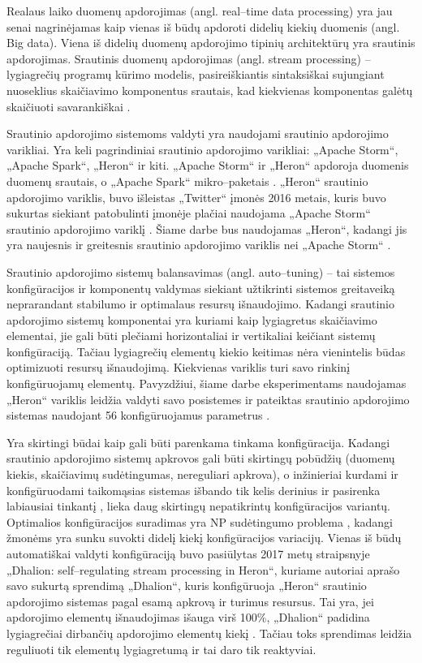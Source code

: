 \documentclass{VUMIFPSbakalaurinis}
\begin{document}
Realaus laiko duomenų apdorojimas (angl. real–time data processing) yra jau senai nagrinėjamas kaip vienas iš būdų apdoroti didelių kiekių duomenis (angl. Big data). Viena iš didelių duomenų apdorojimo tipinių architektūrų yra srautinis apdorojimas. Srautinis duomenų apdorojimas (angl. stream processing) – lygiagrečių programų kūrimo modelis, pasireiškiantis sintaksiškai sujungiant nuoseklius skaičiavimo komponentus srautais, kad kiekvienas komponentas galėtų skaičiuoti savarankiškai \cite{shortstreamproc}. 

Srautinio apdorojimo sistemoms valdyti yra naudojami srautinio apdorojimo varikliai. Yra keli pagrindiniai srautinio apdorojimo varikliai: „Apache Storm“, „Apache Spark“, „Heron“ ir kiti. „Apache Storm“ ir „Heron“ apdoroja duomenis duomenų srautais, o „Apache Spark“ mikro–paketais \cite{karau2015learning}. „Heron“ srautinio apdorojimo variklis, buvo išleistas „Twitter“ įmonės 2016 metais, kuris buvo sukurtas siekiant patobulinti įmonėje plačiai naudojama „Apache Storm“ srautinio apdorojimo variklį \cite{openSourcing}. Šiame darbe bus naudojamas „Heron“, kadangi jis yra naujesnis ir greitesnis srautinio apdorojimo variklis nei „Apache Storm“ \cite{twitterHeron}. 

Srautinio apdorojimo sistemų balansavimas (angl. auto–tuning) – tai sistemos konfigūracijos ir komponentų valdymas siekiant užtikrinti sistemos greitaveiką neprarandant stabilumo ir optimalaus resursų išnaudojimo. Kadangi srautinio apdorojimo sistemų komponentai yra kuriami kaip lygiagretus skaičiavimo elementai, jie gali būti plečiami horizontaliai ir vertikaliai \cite{shortstreamproc} keičiant sistemų konfigūraciją. Tačiau lygiagrečių elementų kiekio keitimas nėra vienintelis būdas optimizuoti resursų išnaudojimą. Kiekvienas variklis turi savo rinkinį konfigūruojamų elementų. Pavyzdžiui, šiame darbe eksperimentams naudojamas „Heron“ variklis leidžia valdyti savo posistemes ir pateiktas srautinio apdorojimo sistemas naudojant 56 konfigūruojamus parametrus \cite{configDocument}.

Yra skirtingi būdai kaip gali būti parenkama tinkama konfigūracija. Kadangi srautinio apdorojimo sistemų apkrovos gali būti skirtingų pobūdžių (duomenų kiekis, skaičiavimų sudėtingumas, nereguliari apkrova), o inžinieriai kurdami ir konfigūruodami taikomąsias sistemas išbando tik kelis derinius ir pasirenka labiausiai tinkantį \cite{selfRegulatingStreaming}, lieka daug skirtingų nepatikrintų konfigūracijos variantų. Optimalios konfigūracijos suradimas yra NP sudėtingumo problema \cite{automateTuning}, kadangi žmonėms yra sunku suvokti didelį kiekį konfigūracijos variacijų. 
Vienas iš būdų automatiškai valdyti konfigūraciją buvo pasiūlytas 2017 metų straipsnyje „Dhalion: self–regulating stream processing in Heron“, kuriame autoriai aprašo savo sukurtą sprendimą „Dhalion“, kuris konfigūruoja „Heron“ srautinio apdorojimo sistemas pagal esamą apkrovą ir turimus resursus. Tai yra, jei apdorojimo elementų išnaudojimas išauga virš 100\%, „Dhalion“ padidina lygiagrečiai dirbančių apdorojimo elementų kiekį \cite{dhalion}. Tačiau toks sprendimas leidžia reguliuoti tik elementų lygiagretumą ir tai daro tik reaktyviai.
\end{document}
